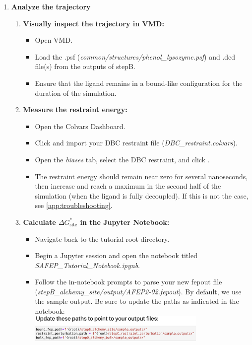 \documentclass[9pt,tutorial,pubversion]{Styling/livecoms}
\newcommand{\filepath}[1]{\textit{#1}}
\newcommand{\button}[1]{\inlineBox[gray]{\texttt{#1}}}
\newcommand{\menu}[1]{\textit{#1}}
\begin{document}
\begin{enumerate}
    \item \textbf{Analyze the trajectory}

    
    \begin{enumerate}[label=\alph*., ref=\theenumi.\alph*] \label{step:analyzeSite}
        \item \textbf{Visually inspect the trajectory in VMD:}
        \begin{itemize}
            \item Open VMD.
            \item Load the .psf (\filepath{common/structures/phenol\_lysozyme.psf}) and .dcd file(s) from the outputs of stepB.
            \item Ensure that the ligand remains in a bound-like configuration for the duration of the simulation.
        \end{itemize}
        \item \textbf{Measure the restraint energy:} 
        \begin{itemize}
            \item Open the Colvars Dashboard.
            \item Click \button{Load} and import your DBC restraint file (\filepath{DBC\_restraint.colvars}).
            \item Open the \menu{biases} tab, select the DBC restraint, and click \button{Energy Timeline}.
            \item The restraint energy should remain near zero for several nanoseconds, then increase and reach a maximum in the second half of the simulation (when the ligand is fully decoupled). If this is not the case, see \ref{app:troubleshooting}.
        \end{itemize}
        \item \textbf{Calculate $\Delta G^*_{\mathrm{site}}$ in the Jupyter Notebook:} \label{step:opennotebook}
        \begin{itemize}
            \item Navigate back to the tutorial root directory.
            \item Begin a Jupyter session and open the notebook titled \filepath{SAFEP\_Tutorial\_Notebook.ipynb}.
            \item Follow the in-notebook prompts to parse your new fepout file  (\filepath{stepB\_alchemy\_site/output/AFEP2-02.fepout}). By default, we use the sample output. Be sure to update the paths as indicated in the notebook:\\ \includegraphics[width=0.75\textwidth, trim={0 0 0 4cm},clip]{update_paths.png}

\end{itemize}
\end{enumerate}
\end{enumerate}
\end{document}

